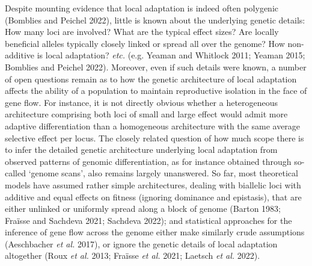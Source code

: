 \documentclass[
  11pt,
]{article}
\begin{document}
Despite mounting evidence that local adaptation is indeed often
polygenic (Bomblies and Peichel 2022), little is known about the
underlying genetic details: How many loci are involved? What are the
typical effect sizes? Are locally beneficial alleles typically closely
linked or spread all over the genome? How non-additive is local
adaptation? \emph{etc.} (e.g. Yeaman and Whitlock 2011; Yeaman 2015;
Bomblies and Peichel 2022). Moreover, even if such details were known, a
number of open questions remain as to how the genetic architecture of
local adaptation affects the ability of a population to maintain
reproductive isolation in the face of gene flow. For instance, it is not
directly obvious whether a heterogeneous architecture comprising both
loci of small and large effect would admit more adaptive differentiation
than a homogeneous architecture with the same average selective effect
per locus. The closely related question of how much scope there is to
infer the detailed genetic architecture underlying local adaptation from
observed patterns of genomic differentiation, as for instance obtained
through so-called `genome scans', also remains largely unanswered. So
far, most theoretical models have assumed rather simple architectures,
dealing with biallelic loci with additive and equal effects on fitness
(ignoring dominance and epistasis), that are either unlinked or
uniformly spread along a block of genome (Barton 1983; Fraïsse and
Sachdeva 2021; Sachdeva 2022); and statistical approaches for the
inference of gene flow across the genome either make similarly crude
assumptions (Aeschbacher \emph{et al.} 2017), or ignore the genetic
details of local adaptation altogether (Roux \emph{et al.} 2013; Fraïsse
\emph{et al.} 2021; Laetsch \emph{et al.} 2022).
\end{document}
